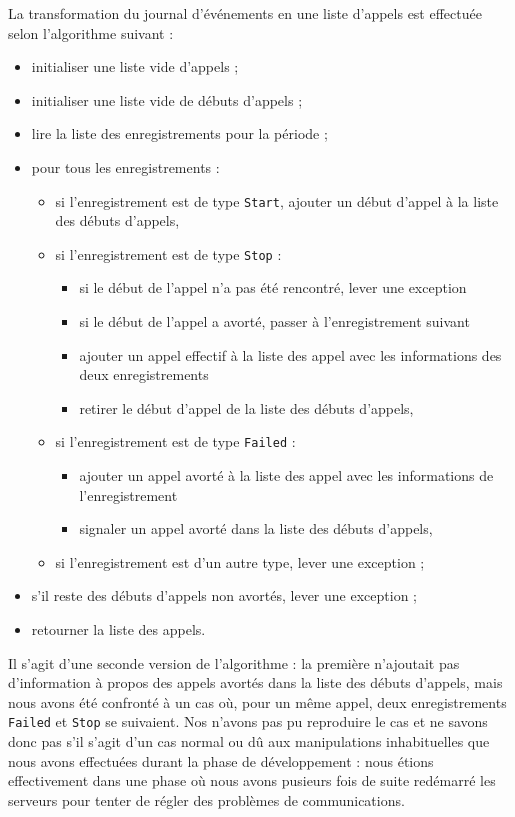 La transformation du journal d’événements en une liste d’appels est effectuée selon l’algorithme suivant :
\begin{itemize}
	\item initialiser une liste vide d’appels ;
	\item initialiser une liste vide de débuts d’appels ;
	\item lire la liste des enregistrements pour la période ;
	\item pour tous les enregistrements :
		\begin{itemize}
			\item si l’enregistrement est de type \texttt{Start}, ajouter un début d’appel à la liste des débuts d’appels,
			\item si l’enregistrement est de type \texttt{Stop} :
				\begin{itemize}
					\item si le début de l’appel n’a pas été rencontré, lever une exception
					\item si le début de l’appel a avorté, passer à l’enregistrement suivant
					\item ajouter un appel effectif à la liste des appel avec les informations des deux enregistrements
					\item retirer le début d’appel de la liste des débuts d’appels,
				\end{itemize}
			\item si l’enregistrement est de type \texttt{Failed} :
				\begin{itemize}
					\item ajouter un appel avorté à la liste des appel avec les informations de l’enregistrement
					\item signaler un appel avorté dans la liste des débuts d’appels,
				\end{itemize}
			\item si l’enregistrement est d’un autre type, lever une exception ;
		\end{itemize}
	\item s’il reste des débuts d’appels non avortés, lever une exception ;
	\item retourner la liste des appels.
\end{itemize}

\vspace{1em}

Il s’agit d’une seconde version de l’algorithme : la première n’ajoutait pas d’information à propos des appels avortés dans la liste des débuts d’appels, mais nous avons été confronté à un cas où, pour un même appel, deux enregistrements \texttt{Failed} et \texttt{Stop} se suivaient. Nos n’avons pas pu reproduire le cas et ne savons donc pas s’il s’agit d’un cas normal ou dû aux manipulations inhabituelles que nous avons effectuées durant la phase de développement : nous étions effectivement dans une phase où nous avons pusieurs fois de suite redémarré les serveurs pour tenter de régler des problèmes de communications.
